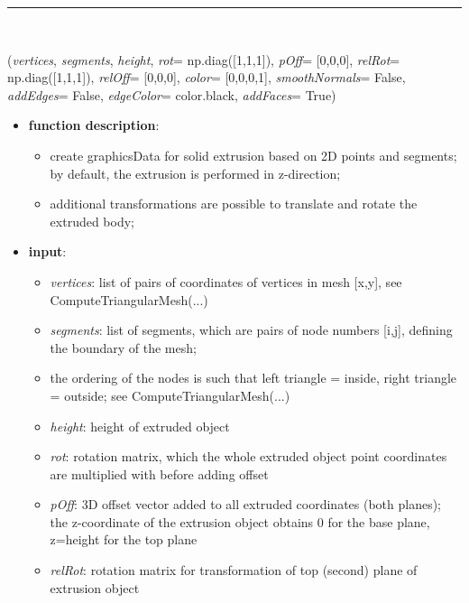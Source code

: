 \begin{itemize}[leftmargin=1.4cm]
\begin{itemize}[leftmargin=1.4cm]
\begin{itemize}[leftmargin=1.4cm]
\begin{itemize}[leftmargin=0.5cm]
\begin{itemize}[leftmargin=1.4cm]
\begin{itemize}[leftmargin=1.4cm]
\begin{itemize}[leftmargin=1.4cm]
\begin{itemize}[leftmargin=0.5cm]
\begin{itemize}[leftmargin=1.4cm]
%
\noindent\rule{8cm}{0.75pt}\vspace{1pt} \\ 
\begin{flushleft}
\label{sec:graphics:SolidExtrusion}
({\it vertices}, {\it segments}, {\it height}, {\it rot}= np.diag([1,1,1]), {\it pOff}= [0,0,0], {\it relRot}= np.diag([1,1,1]), {\it relOff}= [0,0,0], {\it color}= [0,0,0,1], {\it smoothNormals}= False, {\it addEdges}= False, {\it edgeColor}= color.black, {\it addFaces}= True)
\end{flushleft}
\setlength{\itemindent}{0.7cm}
\begin{itemize}[leftmargin=0.7cm]
\item[--]
{\bf function description}: \vspace{-6pt}
\begin{itemize}[leftmargin=1.2cm]
\setlength{\itemindent}{-0.7cm}
\item[]create graphicsData for solid extrusion based on 2D points and segments; by default, the extrusion is performed in z-direction;
\item[]additional transformations are possible to translate and rotate the extruded body;
\end{itemize}
\item[--]
{\bf input}: \vspace{-6pt}
\begin{itemize}[leftmargin=1.2cm]
\setlength{\itemindent}{-0.7cm}
\item[]{\it vertices}: list of pairs of coordinates of vertices in mesh [x,y], see ComputeTriangularMesh(...)
\item[]{\it segments}: list of segments, which are pairs of node numbers [i,j], defining the boundary of the mesh;
\item[]the ordering of the nodes is such that left triangle = inside, right triangle = outside; see ComputeTriangularMesh(...)
\item[]{\it height}:   height of extruded object
\item[]{\it rot}:      rotation matrix, which the whole extruded object point coordinates are multiplied with before adding offset
\item[]{\it pOff}:     3D offset vector added to all extruded coordinates (both planes); the z-coordinate of the extrusion object obtains 0 for the base plane, z=height for the top plane
\item[]{\it relRot}: rotation matrix for transformation of top (second) plane of extrusion object

\end{itemize}
\end{itemize}
\end{itemize}
\end{itemize}
\end{itemize}
\end{itemize}
\end{itemize}
\end{itemize}
\end{itemize}
\end{itemize}
\end{itemize}
